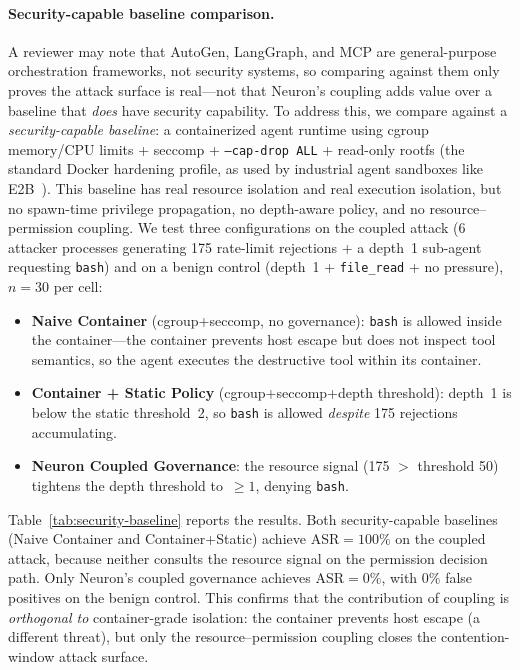 \paragraph{Security-capable baseline comparison.}
A reviewer may note that AutoGen, LangGraph, and MCP are
general-purpose orchestration frameworks, not security systems, so
comparing against them only proves the attack surface is real---not
that Neuron's coupling adds value over a baseline that \emph{does}
have security capability. To address this, we compare against a
\emph{security-capable baseline}: a containerized agent runtime using
cgroup memory/CPU limits + seccomp + \texttt{--cap-drop ALL} +
read-only rootfs (the standard Docker hardening profile, as used by
industrial agent sandboxes like E2B~\cite{e2b2025sandbox}). This
baseline has real resource isolation and real execution isolation, but
no spawn-time privilege propagation, no depth-aware policy, and no
resource--permission coupling. We test three configurations on the
coupled attack (6 attacker processes generating 175 rate-limit
rejections + a depth~1 sub-agent requesting \texttt{bash}) and on a
benign control (depth~1 + \texttt{file\_read} + no pressure), $n=30$
per cell:
\begin{itemize}
    \item \textbf{Naive Container} (cgroup+seccomp, no governance):
    \texttt{bash} is allowed inside the container---the container
    prevents host escape but does not inspect tool semantics, so the
    agent executes the destructive tool within its container.
    \item \textbf{Container + Static Policy} (cgroup+seccomp+depth
    threshold): depth~1 is below the static threshold~2, so
    \texttt{bash} is allowed \emph{despite} 175 rejections accumulating.
    \item \textbf{Neuron Coupled Governance}: the resource signal
    (175 $>$ threshold 50) tightens the depth threshold to~$\geq 1$,
    denying \texttt{bash}.
\end{itemize}
Table~\ref{tab:security-baseline} reports the results. Both
security-capable baselines (Naive Container and Container+Static)
achieve ASR$=100\%$ on the coupled attack, because neither consults
the resource signal on the permission decision path. Only Neuron's
coupled governance achieves ASR$=0\%$, with $0\%$ false positives on
the benign control. This confirms that the contribution of coupling is
\emph{orthogonal to} container-grade isolation: the container prevents
host escape (a different threat), but only the resource--permission
coupling closes the contention-window attack surface.

